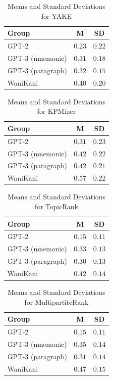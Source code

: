 \begin{table}[ht] 
\centering
\caption{Means and Standard Deviations for YAKE}
\label{table:group_stats}
\begin{tabular}{lcc}
\toprule
Group & M & SD\\
\midrule
GPT-2& $0.23$ & $0.22$ \\
GPT-3 (mnemonic) & $0.31$ & $0.18$ \\
GPT-3 (paragraph)& $0.32$ & $0.15$ \\
WaniKani & $0.40$ & $0.20$ \\
\bottomrule
\end{tabular}
\label{tab:yake_centrality}
\end{table}
\begin{table}[ht] 
\centering
\caption{Means and Standard Deviations for KPMiner}
\label{table:group_stats}
\begin{tabular}{lcc}
\toprule
Group & M & SD\\
\midrule
GPT-2& $0.31$ & $0.23$ \\
GPT-3 (mnemonic) & $0.42$ & $0.22$ \\
GPT-3 (paragraph)& $0.42$ & $0.21$ \\
WaniKani & $0.57$ & $0.22$ \\
\bottomrule
\end{tabular}
\label{tab:kpminer_centrality}
\end{table}
\begin{table}[ht] 
\centering
\caption{Means and Standard Deviations for TopicRank}
\begin{tabular}{lcc}
\toprule
Group & M & SD\\
\midrule
GPT-2& $0.15$ & $0.11$ \\
GPT-3 (mnemonic) & $0.33$ & $0.13$ \\
GPT-3 (paragraph)& $0.30$ & $0.13$ \\
WaniKani & $0.42$ & $0.14$ \\
\bottomrule
\end{tabular}
\label{tab:topic_rank_centrality}
\end{table}
\begin{table}[ht] 
\centering
\caption{Means and Standard Deviations for MultipartiteRank}
\begin{tabular}{lcc}
\toprule
Group & M & SD\\
\midrule
GPT-2& $0.15$ & $0.11$ \\
GPT-3 (mnemonic) & $0.35$ & $0.14$ \\
GPT-3 (paragraph)& $0.31$ & $0.14$ \\
WaniKani & $0.47$ & $0.15$ \\
\bottomrule
\end{tabular}
\label{tab:multipartite_rank_centrality}
\end{table}

